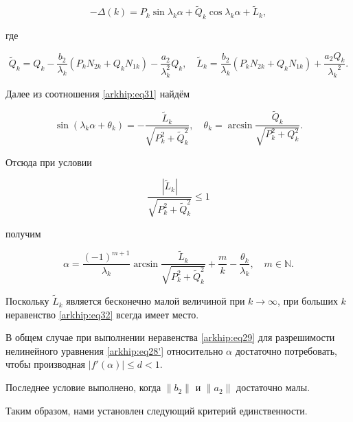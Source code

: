 \begin{equation}

\label{arkhip:eq31}

 - \Delta (k) = P_{k}\sin{\lambda_{k} \alpha} + \widetilde Q_{k}\cos{\lambda_{k} \alpha} + \widetilde L_{k},

\end{equation}

где

$$\widetilde Q_{k} = Q_{k}-\displaystyle\frac{b_{2}}{\lambda_{k}}\left(P_{k}N_{2 k} + Q_{k}N_{1 k}\right) - \displaystyle\frac{a_{2}}{\lambda_{k}^2}Q_{k}, \quad 

\widetilde L_{k} = \displaystyle\frac{b_{2}}{\lambda_{k}}\left(P_{k}N_{2 k} + Q_{k}N_{1 k}\right) + \displaystyle\frac{a_{2}Q_{k}}{{\lambda_{k}}^2}.$$

Далее из соотношения \eqref{arkhip:eq31} найдём

$$\sin{\left(\lambda_{k}\alpha + \theta_{k}\right)} = -\displaystyle\frac{\widetilde L_{k}}{\sqrt{P_{k}^2 + \widetilde Q_{k}^2}}, \quad  \theta_{k} = \arcsin{\displaystyle\frac{\widetilde Q_{k}}{\sqrt{P_{k}^2 +  Q_{k}^2}}}.$$

Отсюда при условии

\begin{equation}\label{arkhip:eq32}

\frac{|\widetilde L_{k}|}{\sqrt{P_{k}^2 + \widetilde Q_{k}^2}} \le 1

\end{equation}

получим

$$\alpha = \displaystyle\frac{\left({-1}\right)^{m+1}}{\lambda_{k}}\arcsin\frac{\widetilde L_{k}}{\sqrt{P_{k}^2 + \widetilde Q_{k}^2}} + \displaystyle \frac{m}{k}-\frac{\theta_{k}}{\lambda_{k}}, \quad  m\in \mathbb N .$$



Поскольку $\widetilde L_{k}$ является бесконечно малой величиной при $k \to \infty$, при больших $k$ неравенство \eqref{arkhip:eq32} всегда имеет место.



В общем случае при выполнении неравенства \eqref{arkhip:eq29}  для разрешимости  нелинейного уравнения \eqref{arkhip:eq28'}  относительно $\alpha$ достаточно потребовать, чтобы производная $|f'(\alpha)|\le d<1$.

Последнее условие выполнено, когда $\| b_{2}\| $  и $\| a_{2}\| $ достаточно малы.



Таким образом, нами установлен следующий критерий единственности.



